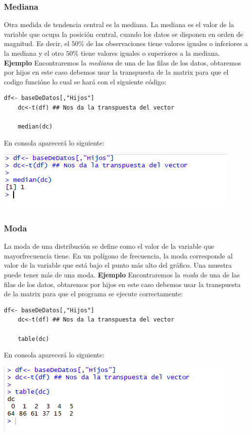 \documentclass[12pt,hidelinks]{article}
\begin{document}
	\subsubsection{Mediana}
	Otra medida de tendencia central es la mediana. La mediana es el valor de la variable que ocupa la posición central, cuando los datos se disponen en orden de magnitud. Es decir, el $50\%$ de las observaciones tiene valores iguales o inferiores a la mediana y el otro $50\%$ tiene valores iguales o superiores a la mediana. \textbf{Ejemplo} Encontraremos la \textit{mediana} de una de las filas de los datos, obtaremos por hijos  en este caso debemos usar la transpuesta de la matrix para que el codigo funcióne lo cual se hará con el siguiente código:
	\begin{lstlisting}[frame=single]
	df<- baseDeDatos[,"Hijos"]
	dc<-t(df) ## Nos da la transpuesta del vector
	
	median(dc)
	\end{lstlisting}
	En consola aparecerá lo siguiente:
	\begin{center}
		\includegraphics[]{Mediana.PNG}
	\end{center}
	\subsubsection{Moda}
	La moda de una distribución se define como el valor de la variable que mayorfrecuencia tiene. En un polígono de frecuencia, la moda corresponde al valor de la variable que está bajo el punto más alto del gráfico. Una muestra puede tener más de una moda. \textbf{Ejemplo} Encontraremos la \textit{moda} de una de las filas de los datos, obtaremos por hijos en este caso debemos usar la transpuesta de la matrix para que el programa se ejecute correctamente:
	\begin{lstlisting}[frame=single]
	df<- baseDeDatos[,"Hijos"]
	dc<-t(df) ## Nos da la transpuesta del vector
	
	table(dc)
	\end{lstlisting}
	En consola aparecerá lo siguiente:
	\begin{center}
		\includegraphics[]{Moda.PNG}
	\end{center}
\end{document}
